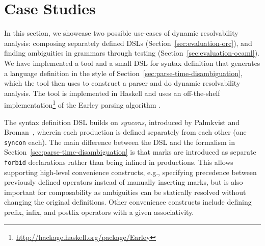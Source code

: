 \documentclass[runningheads]{llncs}
\newcommand{\syncon}{\lstinline[language=syncon]}
\newcommand{\parse}{\mathit{parse}} %
\newcommand{\words}{\mathit{words}} %
\newcommand{\alt}{\mathit{alt}} %
\newcommand{\basic}{\mathit{basic}} %
\begin{document}


\section{Case Studies} \label{sec:evaluation}

In this section, we showcase two possible use-cases of dynamic
resolvability analysis: composing separately defined DSLs
(Section~\ref{sec:evaluation-orc}), and finding ambiguities in
grammars through testing (Section~\ref{sec:evaluation-ocaml}).
%
We have implemented a tool and a small DSL for syntax definition
that generates a language definition in the style of
Section~\ref{sec:parse-time-disambiguation}, which the tool then
uses to construct a parser and do dynamic resolvability analysis.
The tool is implemented in Haskell and uses an off-the-shelf
implementation\footnote{\url{http://hackage.haskell.org/package/Earley}}
of the Earley parsing algorithm
\cite{earleyEfficientContextfreeParsing1970}.

The syntax definition DSL builds on \emph{syncons}, introduced by
Palmkvist and Broman~\cite{palmkvistCreatingDomainSpecificLanguages2019}, wherein each
production is defined separately from each other (one
\syncon{syncon} each).
%
The main difference between the DSL and the formalism in
Section~\ref{sec:parse-time-disambiguation} is that marks are
introduced as separate \syncon{forbid} declarations rather than
being inlined in productions. This allows supporting high-level
convenience constructs, e.g., specifying precedence between
previously defined operators instead of manually inserting marks,
but is also important for composability as ambiguities can be
statically resolved without changing the original definitions.
Other convenience constructs include defining prefix, infix, and
postfix operators with a given associativity.
\end{document}
